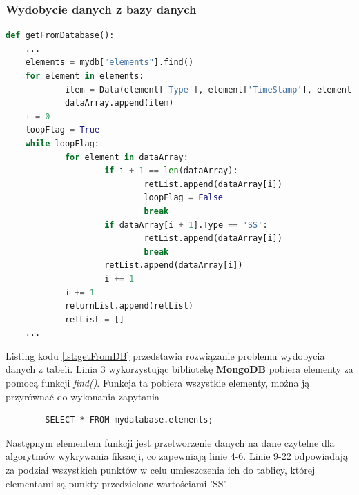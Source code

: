 \subsubsection{Wydobycie danych z bazy danych}
\label{ssec:getDB}
\begin{lstlisting}[language=Python, caption=Wydobycie danych z bazy danych, label={lst:getFromDB}]
def getFromDatabase():
    ...
    elements = mydb["elements"].find()
    for element in elements:
            item = Data(element['Type'], element['TimeStamp'], element['CoordX'], element['CoordY'])
            dataArray.append(item)
    i = 0
    loopFlag = True
    while loopFlag:
            for element in dataArray:
                    if i + 1 == len(dataArray):
                            retList.append(dataArray[i])
                            loopFlag = False
                            break
                    if dataArray[i + 1].Type == 'SS':
                            retList.append(dataArray[i])
                            break
                    retList.append(dataArray[i])
                    i += 1
            i += 1
            returnList.append(retList)
            retList = []
    ...
    \end{lstlisting}
Listing kodu \ref{lst:getFromDB} przedstawia rozwiązanie problemu wydobycia danych z tabeli. Linia 3 wykorzystując bibliotekę \textbf{MongoDB} pobiera elementy za pomocą funkcji \emph{find()}. Funkcja ta pobiera wszystkie elementy, można ją przyrównać do wykonania zapytania 
\begin{verbatim}
        SELECT * FROM mydatabase.elements;
\end{verbatim}
Następnym elementem funkcji jest przetworzenie danych na dane czytelne dla algorytmów wykrywania fiksacji, co zapewniają linie 4-6. Linie 9-22 odpowiadają za podział wszystkich punktów w celu umieszczenia ich do tablicy, której elementami są punkty przedzielone wartościami 'SS'.
